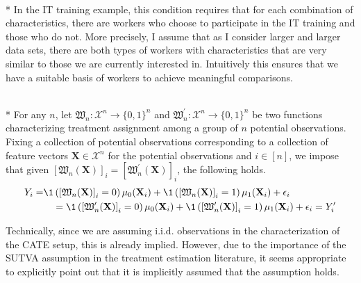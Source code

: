 \begin{boxE}
    \addtocounter{exmp}{-1}
    \begin{exmp}\mbox{}\\*
        In the IT training example, this condition requires that for each combination of characteristics, there are workers who choose to participate in the IT training and those who do not.
        More precisely, I assume that as I consider larger and larger data sets, there are both types of workers with characteristics that are very similar to those we are currently interested in.
        Intuitively this ensures that we have a suitable basis of workers to achieve meaningful comparisons.
    \end{exmp}    
\end{boxE}

\begin{boxD}
	\begin{asm}\label{asm:sutva}\mbox{}\\*
		For any $n$, let $\mathfrak{W}_{n}: \mathcal{X}^{n} \rightarrow \{0,1\}^{n}$ and $\mathfrak{W}_{n}^{\prime}: \mathcal{X}^{n} \rightarrow \{0,1\}^{n}$ be two functions characterizing treatment assignment among a group of $n$ potential observations.
		Fixing a collection of potential observations corresponding to a collection of feature vectors $\mathbf{X} \in  \mathcal{X}^{n}$ for the potential observations and $i \in [n]$, we impose that given $\left[\mathfrak{W}_{n}(\mathbf{X})\right]_{i} = \left[\mathfrak{W}_{n}^{\prime}(\mathbf{X})\right]_{i}$, the following holds.
		\begin{equation}
			\begin{aligned}
				Y_{i} = & \1\left(\left[\mathfrak{W}_{n}(\mathbf{X})\right]_{i} = 0\right)\mu_{0}(\mathbf{X}_i)
				+ \1\left(\left[\mathfrak{W}_{n}(\mathbf{X})\right]_{i} = 1\right)\mu_{1}(\mathbf{X}_i)
				+ \epsilon_i \\
				&\quad  = 
				\1\left(\left[\mathfrak{W}_{n}^{\prime}(\mathbf{X})\right]_{i} = 0\right)\mu_{0}(\mathbf{X}_i)
				+\1\left(\left[\mathfrak{W}_{n}^{\prime}(\mathbf{X})\right]_{i} = 1\right)\mu_{1}(\mathbf{X}_i)
				+ \epsilon_i
				= Y_{i}^{\prime}
			\end{aligned}
		\end{equation}
	\end{asm}
\end{boxD}
Technically, since we are assuming i.i.d. observations in the characterization of the CATE setup, this is already implied.
However, due to the importance of the SUTVA assumption in the treatment estimation literature, it seems appropriate to explicitly point out that it is implicitly assumed that the assumption holds.
